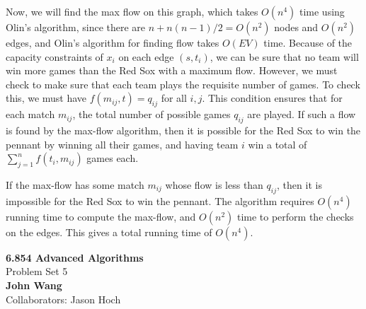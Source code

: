 \documentclass[psamsfonts]{amsart}
\newenvironment{sol}{\vspace{0.25cm}{\large \bfseries Solution:}}{\qedsymbol}
\newcommand{\makenewtitle}{
    \begin{center}
    {\huge \bfseries 6.854 Advanced Algorithms} \\
    Problem Set 5\\
    \vspace{0.25cm}
    {\bfseries John Wang} \\
    Collaborators: Jason Hoch
    \end{center}
    \vspace{0.5cm}
}
\begin{document}
\begin{sol}
Now, we will find the max flow on this graph, which takes $O(n^4)$ time using Olin's algorithm, since there are $n + n(n-1)/2 = O(n^2)$ nodes and $O(n^2)$ edges, and Olin's algorithm for finding flow takes $O(EV)$ time. Because of the capacity constraints of $x_i$ on each edge $(s,t_i)$, we can be sure that no team will win more games than the Red Sox with a maximum flow. However, we must check to make sure that each team plays the requisite number of games. To check this, we must have $f(m_{ij}, t) = q_{ij}$ for all $i,j$. This condition ensures that for each match $m_{ij}$, the total number of possible games $q_{ij}$ are played. If such a flow is found by the max-flow algorithm, then it is possible for the Red Sox to win the pennant by winning all their games, and having team $i$ win a total of $\sum_{j=1}^n f(t_i, m_{ij})$ games each. 

If the max-flow has some match $m_{ij}$ whose flow is less than $q_{ij}$, then it is impossible for the Red Sox to win the pennant. The algorithm requires $O(n^4)$ running time to compute the max-flow, and $O(n^2)$ time to perform the checks on the edges. This gives a total running time of $O(n^4)$.
\end{sol}

\newpage
\makenewtitle
\end{document}
